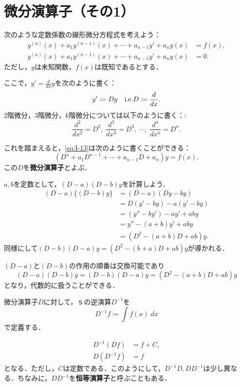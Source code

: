 \section{微分演算子（その1）}
次のような定数係数の線形微分方程式を考えよう：
\begin{align}
    y^{(n)}(x) + a_1y^{(n-1)}(x) + \cdots +a_{n-1}y' + a_ny(x) &= f(x), \label{eq:I-13} \\
    y^{(n)}(x) + a_1y^{(n-1)}(x) + \cdots +a_{n-1}y' + a_ny(x) &= 0. \label{eq:H-13}
\end{align}
ただし，$y$は未知関数，$f(x)$は既知であるとする．

ここで，$y' = \frac{d}{dx}y$を次のように書く：
\[ y' \coloneqq Dy \quad \text{i.e.} D \coloneqq \frac{d}{dx}.\]
2階微分，3階微分，$k$階微分については以下のように書く：:
\[ \frac{d^2}{dx^2} = D^2, \; \frac{d^3}{dx^3} = D^3, \; \cdots, \; \frac{d^n}{dx^n} = D^n.\]

これを踏まえると，\eqref{eq:I-13}は次のように書くことができる：
\[ (D^n+a_1D^{n-1}+\cdots+a_{n-1}D+a_n)y = f(x).\]
この$D$を\textbf{微分演算子}とよぶ．

\begin{example}
    $a,b$を定数として，$(D-a)(D-b)y$を計算しよう．
    \begin{align*}
        (D-a)\{(D-b)y\} &= (D-a)(Dy-by) \\
        &= D(y'-by) - a(y'-by) \\
        &= (y''-by') - ay' + aby \\
        &= y'' -(a+b)y' + aby \\
        &= (D^2-(a+b)D+ab)y.
    \end{align*}
    同様にして$(D-b)(D-a)y=(D^2-(b+a)D+ab)y$が導かれる．
\end{example}

\begin{remark}
    $(D-a)$と$(D-b)$の作用の順番は交換可能であり
    \[ (D-a)(D-b)y = (D-b)(D-a)y = (D^2-(a+b)D+ab)y\]
    となり，代数的に扱うことができる．
\end{remark}

微分演算子$D$に対して，ｓの逆演算$D^{-1}$を
\[ D^{-1} f\coloneqq \int f(x) \; dx\]
で定義する．

\begin{note*}
    \begin{align*}
        D^{-1}(Df) &= f + C, \\
        D(D^{-1}f) &= f
    \end{align*}
    となる．ただし，$C$は定数である．このようにして，$D^{-1}D, DD^{-1}$は少し異なる．ちなみに，$DD^{-1}$を\textbf{恒等演算子}と呼ぶこともある．
\end{note*}

